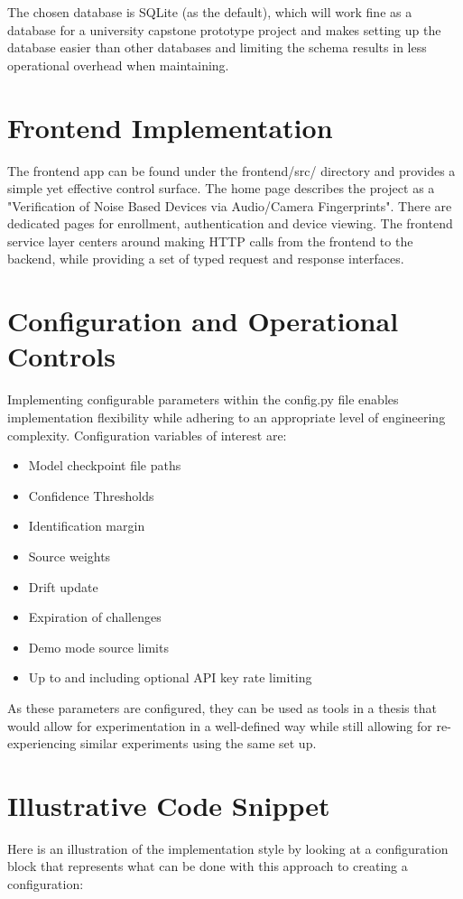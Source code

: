 The chosen database is SQLite (as the default), which will work fine as a database for a university capstone prototype project and makes setting up the database easier than other databases and limiting the schema results in less operational overhead when maintaining.

\section{Frontend Implementation}
The frontend app can be found under the frontend/src/ directory and provides a simple yet effective control surface. The home page describes the project as a "Verification of Noise Based Devices via Audio/Camera Fingerprints". There are dedicated pages for enrollment, authentication and device viewing. The frontend service layer centers around making HTTP calls from the frontend to the backend, while providing a set of typed request and response interfaces.

\section{Configuration and Operational Controls}
Implementing configurable parameters within the config.py file enables implementation flexibility while adhering to an appropriate level of engineering complexity. Configuration variables of interest are:
\begin{itemize}
	\item Model checkpoint file paths
	\item Confidence Thresholds
	\item Identification margin
	\item Source weights
	\item Drift update
	\item Expiration of challenges
	\item Demo mode source limits
	\item Up to and including optional API key rate limiting
\end{itemize}

As these parameters are configured, they can be used as tools in a thesis that would allow for experimentation in a well-defined way while still allowing for re-experiencing similar experiments using the same set up.

\section{Illustrative Code Snippet}
Here is an illustration of the implementation style by looking at a configuration block that represents what can be done with this approach to creating a configuration:

